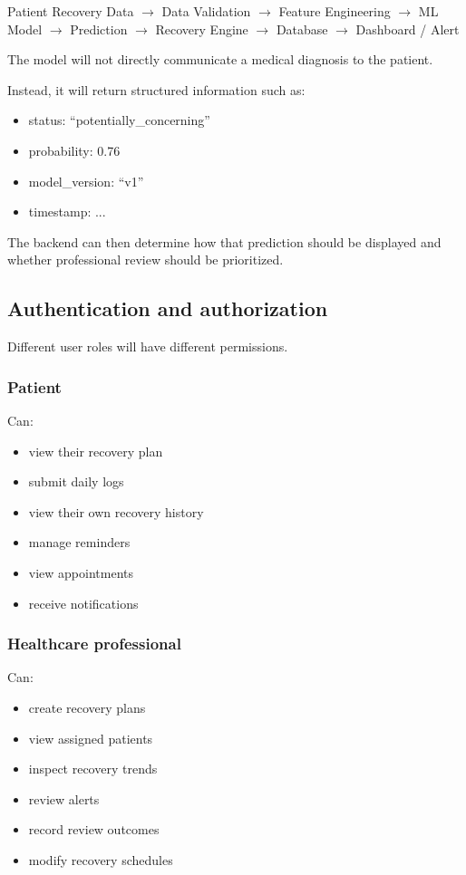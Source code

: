 \documentclass[11pt,a4paper]{article}
\begin{document}
Patient Recovery Data $\rightarrow$
Data Validation $\rightarrow$
Feature Engineering $\rightarrow$
ML Model $\rightarrow$
Prediction $\rightarrow$
Recovery Engine $\rightarrow$
Database $\rightarrow$
Dashboard / Alert

The model will not directly communicate a medical diagnosis
to the patient.

Instead, it will return structured information such as:
\begin{itemize}[leftmargin=0.7cm]
    \item status: ``potentially\_concerning''
    \item probability: 0.76
    \item model\_version: ``v1''
    \item timestamp: ...
\end{itemize}

The backend can then determine how that prediction should be
displayed and whether professional review should be prioritized.

\subsection{Authentication and authorization}

Different user roles will have different permissions.

\subsubsection{Patient}

Can:
\begin{itemize}[leftmargin=0.7cm]
    \item view their recovery plan
    \item submit daily logs
    \item view their own recovery history
    \item manage reminders
    \item view appointments
    \item receive notifications
\end{itemize}

\subsubsection{Healthcare professional}

Can:
\begin{itemize}[leftmargin=0.7cm]
    \item create recovery plans
    \item view assigned patients
    \item inspect recovery trends
    \item review alerts
    \item record review outcomes
    \item modify recovery schedules
\end{itemize}
\end{document}
